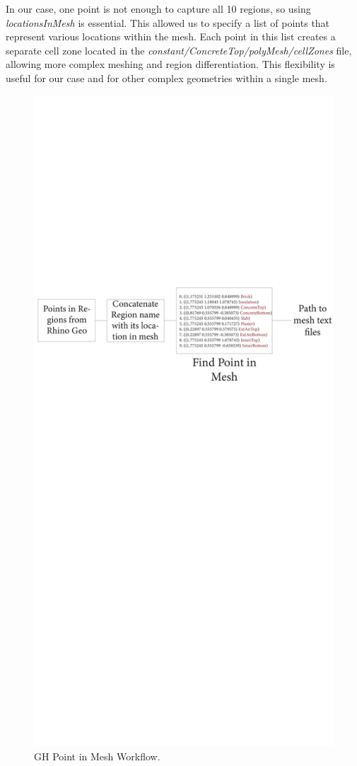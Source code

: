 In our case, one point is not enough to capture all 10 regions, so using \textit{locationsInMesh} is essential. This allowed us to specify a list of points that represent various locations within the mesh. Each point in this list creates a separate cell zone located in the \textit{constant/ConcreteTop/polyMesh/cellZones} file, allowing more complex meshing and region differentiation. This flexibility is useful for our case and for other complex geometries within a single mesh.

\begin{figure}[tb]
\centering
\includegraphics[trim=0cm 45cm 0cm 24cm, clip, width=0.8\linewidth]{Figures/locinmeshgh.pdf}
\hspace{0.7cm}
\caption{\gls{GH} Point in Mesh Workflow.}
\label{locgh}
\end{figure}








